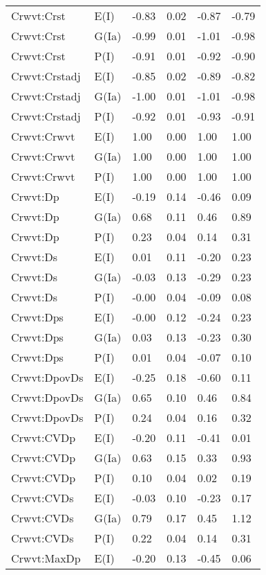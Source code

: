 \begin{center}
\begin{longtable}{|p{1.1in}|p{0.7in}|p{0.7in}|p{0.6in}|p{0.6in}|p{0.6in}|}
  Crwvt:Crst & E(I) & -0.83 & 0.02 & -0.87 & -0.79 \\ 
  Crwvt:Crst & G(Ia) & -0.99 & 0.01 & -1.01 & -0.98 \\ 
  Crwvt:Crst & P(I) & -0.91 & 0.01 & -0.92 & -0.90 \\ 
  Crwvt:Crstadj & E(I) & -0.85 & 0.02 & -0.89 & -0.82 \\ 
  Crwvt:Crstadj & G(Ia) & -1.00 & 0.01 & -1.01 & -0.98 \\ 
  Crwvt:Crstadj & P(I) & -0.92 & 0.01 & -0.93 & -0.91 \\ 
  Crwvt:Crwvt & E(I) & 1.00 & 0.00 & 1.00 & 1.00 \\ 
  Crwvt:Crwvt & G(Ia) & 1.00 & 0.00 & 1.00 & 1.00 \\ 
  Crwvt:Crwvt & P(I) & 1.00 & 0.00 & 1.00 & 1.00 \\ 
  Crwvt:Dp & E(I) & -0.19 & 0.14 & -0.46 & 0.09 \\ 
  Crwvt:Dp & G(Ia) & 0.68 & 0.11 & 0.46 & 0.89 \\ 
  Crwvt:Dp & P(I) & 0.23 & 0.04 & 0.14 & 0.31 \\ 
  Crwvt:Ds & E(I) & 0.01 & 0.11 & -0.20 & 0.23 \\ 
  Crwvt:Ds & G(Ia) & -0.03 & 0.13 & -0.29 & 0.23 \\ 
  Crwvt:Ds & P(I) & -0.00 & 0.04 & -0.09 & 0.08 \\ 
  Crwvt:Dps & E(I) & -0.00 & 0.12 & -0.24 & 0.23 \\ 
  Crwvt:Dps & G(Ia) & 0.03 & 0.13 & -0.23 & 0.30 \\ 
  Crwvt:Dps & P(I) & 0.01 & 0.04 & -0.07 & 0.10 \\ 
  Crwvt:DpovDs & E(I) & -0.25 & 0.18 & -0.60 & 0.11 \\ 
  Crwvt:DpovDs & G(Ia) & 0.65 & 0.10 & 0.46 & 0.84 \\ 
  Crwvt:DpovDs & P(I) & 0.24 & 0.04 & 0.16 & 0.32 \\ 
  Crwvt:CVDp & E(I) & -0.20 & 0.11 & -0.41 & 0.01 \\ 
  Crwvt:CVDp & G(Ia) & 0.63 & 0.15 & 0.33 & 0.93 \\ 
  Crwvt:CVDp & P(I) & 0.10 & 0.04 & 0.02 & 0.19 \\ 
  Crwvt:CVDs & E(I) & -0.03 & 0.10 & -0.23 & 0.17 \\ 
  Crwvt:CVDs & G(Ia) & 0.79 & 0.17 & 0.45 & 1.12 \\ 
  Crwvt:CVDs & P(I) & 0.22 & 0.04 & 0.14 & 0.31 \\ 
  Crwvt:MaxDp & E(I) & -0.20 & 0.13 & -0.45 & 0.06 \\ 

\end{longtable}
\end{center}
